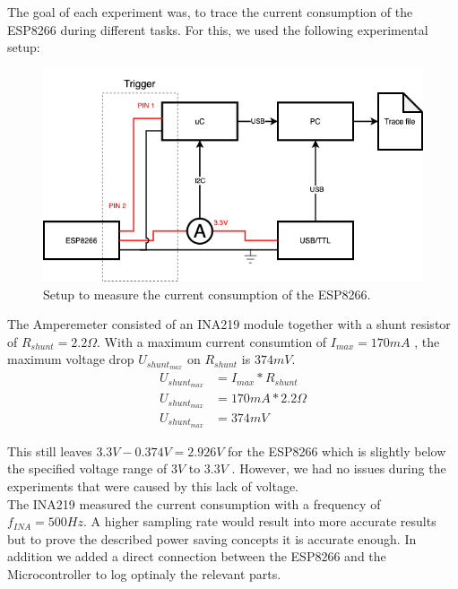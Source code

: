 The goal of each experiment was, to trace the current consumption of the ESP8266 during different tasks.
For this, we used the following experimental setup:

\begin{figure}[h]
    \centering
    \includegraphics[width = \linewidth]{fig/experimental_setup.png}
    \caption{Setup to measure the current consumption of the ESP8266.}
    \label{fig:experiment_setup}
\end{figure}

The Amperemeter consisted of an INA219 module together with a shunt resistor of $R_{shunt} = 2.2 \Omega$.
With a maximum current consumtion of $I_{max}=170 mA$ \cite{espressif_inc_esp8266_2016}, the maximum voltage drop $U_{shunt_{max}}$ on $R_{shunt}$ is $374mV$.
\begin{align*}
    U_{shunt_{max}} &= I_{max} * R_{shunt}\\
    U_{shunt_{max}} &= 170mA * 2.2 \Omega\\
    U_{shunt_{max}} &= 374mV
\end{align*}

This still leaves $3.3V - 0.374V = 2.926V$ for the ESP8266 which is slightly below the specified voltage range of $3V$ to $3.3V$ \cite{espressif_inc_esp8266_2016}.
However, we had no issues during the experiments that were caused by this lack of voltage.\\
The INA219 measured the current consumption with a frequency of $f_{INA} = 500Hz$.
A higher sampling rate would result into more accurate results but to prove the
described power saving concepts it is accurate enough.
In addition we added a direct connection between the ESP8266 and the Microcontroller
to log optinaly the relevant parts.


